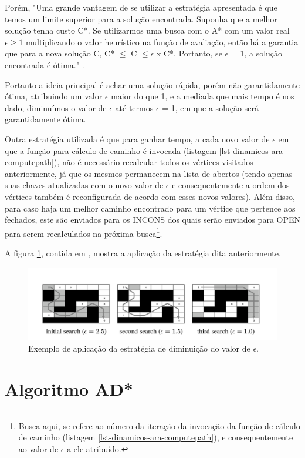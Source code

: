 Porém, "Uma grande vantagem de se utilizar a estratégia apresentada é que temos um limite superior para a solução encontrada. Suponha que a melhor solução tenha custo C*. Se utilizarmos uma busca com o A* com um valor real $\epsilon \geq 1$ multiplicando o valor heurístico na função de avaliação, então há a garantia que para a nova solução C, C* $\leq$ C $\leq \epsilon$ x C*. Portanto, se $\epsilon$ = 1, a solução encontrada é ótima." \cite{moura2010estudo}.

Portanto a ideia principal é achar uma solução rápida, porém não-garantidamente ótima, atribuindo um valor $\epsilon$ maior do que 1, e a mediada que mais tempo é nos dado, diminuímos o valor de $\epsilon$ até termos $\epsilon$ = 1, em que a solução será garantidamente ótima. 

Outra estratégia utilizada é que para ganhar tempo, a cada novo valor de $\epsilon$ em que a função para cálculo de caminho é invocada (listagem \ref{lst-dinamicos-ara-computepath}), não é necessário recalcular todos os vértices visitados anteriormente, já que os mesmos permanecem na lista de abertos (tendo apenas suas chaves atualizadas com o novo valor de $\epsilon$ e consequentemente a ordem dos vértices também é reconfigurada de acordo com esses novos valores). Além disso, para caso haja um melhor caminho encontrado para um vértice que pertence aos fechados, este são enviados para os INCONS dos quais serão enviados para OPEN para serem recalculados na próxima busca\footnote{Busca aqui, se refere ao número da iteração da invocação da função de cálculo de caminho (listagem \ref{lst-dinamicos-ara-computepath}), e consequentemente ao valor de $\epsilon$ a ele atribuído.}.

A figura \ref{fig-ara-exemplo}, contida em , mostra a aplicação da estratégia dita anteriormente.

\begin{figure}[H]
\centering
\includegraphics[width=.80\textwidth]{figuras/ara-3} 
\caption{Exemplo de aplicação da estratégia de diminuição do valor de $\epsilon$.}
\label{fig-ara-exemplo}
\end{figure}
\section{Algoritmo AD*}
\label{sec-dinamicos-ad}

